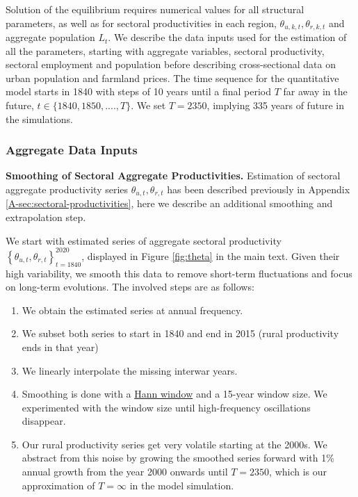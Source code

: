 \documentclass[11pt]{report}
\begin{document}
Solution of the equilibrium requires numerical values for all structural parameters, as well as for sectoral productivities in each region, $\theta_{u,k,t},\theta_{r,k,t}$ and aggregate population $L_t$. We describe the data inputs used for the estimation of all the parameters, starting with aggregate variables, sectoral productivity, sectoral employment and population before describing cross-sectional data on urban population and farmland prices. The time sequence for the quantitative model starts in 1840 with steps of 10 years until a final period $T$ far away in the future, $t \in \{1840, 1850, ...., T\}$. We set $T =  2350$, implying 335 years of future in the simulations.

\subsubsection{Aggregate Data Inputs}\label{B-sec:input-aggregate}

\textbf{Smoothing of Sectoral Aggregate Productivities.} Estimation of sectoral aggregate productivity series $\theta_{u,t},\theta_{r,t}$ has been described previously in Appendix \ref{A-sec:sectoral-productivities}, here we describe an additional smoothing and extrapolation step.

We start with estimated series of aggregate sectoral productivity $\left\{\theta_{u,t},\theta_{r,t}\right\}_{t=1840}^{2020}$, displayed in Figure \ref{fig:theta} in the main text. Given their high variability, we smooth this data to remove short-term fluctuations and focus on long-term evolutions. The involved steps are as follows:

    \begin{enumerate}
        \item We obtain the estimated series at annual frequency.
        \item We subset both series to start in 1840 and end in 2015 (rural productivity ends in that year)
        \item We linearly interpolate the missing interwar years.
        \item Smoothing is done with a \href{https://en.wikipedia.org/wiki/Hann_function}{Hann window} and a 15-year window size. We experimented with the window size until high-frequency oscillations disappear.
        \item Our rural productivity series get very volatile starting at the 2000s. We abstract from this noise by growing the smoothed series forward with 1\% annual growth from the year 2000 onwards until $T=2350$, which is our approximation of $T=\infty$ in the model simulation. %
    \end{enumerate}
    
\end{document}
